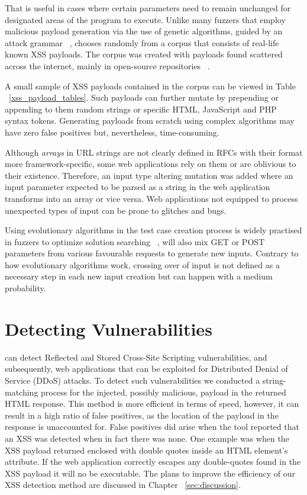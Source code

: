 That is useful in cases where certain parameters need to remain unchanged for designated areas of the program to execute. Unlike many fuzzers that employ malicious payload generation via the use of genetic algorithms, guided by an attack grammar ~\cite{duchene2014kameleonfuzz}, \pname{} chooses randomly from a corpus that consists of real-life known XSS payloads. The corpus was created with payloads found scattered across the internet, mainly in open-source repositories ~\cite{seclist,xsspayloadfirst,xsspayloadsecond}.

A small sample of XSS payloads contained in the corpus can be viewed in Table ~\ref{xss_payload_tables}. Such payloads can further mutate by prepending or appending to them random strings or specific HTML, JavaScript and PHP syntax tokens. Generating payloads from scratch using complex algorithms may have zero false positives but, nevertheless, time-consuming.

Although \emph{arrays} in URL strings are not clearly defined in RFCs with their format more framework-specific, some web applications rely on them or are oblivious to their existence. Therefore, an input type altering mutation was added where an input parameter expected to be parsed as a string in the web application transforms into an array or vice versa. Web applications not equipped to process unexpected types of input can be prone to glitches and bugs.

Using evolutionary algorithms in the test case creation process is widely practised in fuzzers
to optimize solution searching ~\cite{seal2016Genetic}, \pname{} will also mix GET or POST parameters from various favourable requests to generate new inputs. Contrary to how evolutionary algorithms work, crossing over of input is not defined as a necessary step in each new input creation but can happen with a medium probability.

\section{Detecting Vulnerabilities}
\pname{} can detect Reflected and Stored Cross-Site Scripting vulnerabilities, and subsequently, web applications that can be exploited for Distributed Denial of Service (DDoS) attacks. To detect such vulnerabilities we conducted a string-matching process for the injected, possibly malicious, payload in the returned HTML response. This method is more efficient in terms of speed, however, it can result in a high ratio of false positives, as the location of the payload in the response is unaccounted for. False positives did arise when the tool reported that an XSS was detected when in fact there was none. One example was when the XSS payload returned enclosed with double quotes inside an HTML element's attribute. If the web application correctly escapes any double-quotes found in the XSS payload it will no be executable. The plans to improve the efficiency of our XSS detection method are discussed in Chapter ~\ref{sec:discussion}.


